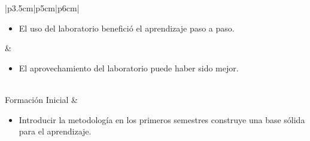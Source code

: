 \documentclass[12pt]{article}
\begin{document}
\begin{longtable}{|p{3.5cm}|p{5cm}|p{6cm}|}
\begin{minipage}[H]{1.0\linewidth}
\begin{itemize}[leftmargin=8pt]
                                 \item El uso del laboratorio benefició el aprendizaje paso a paso.
                                 \end{itemize}
                                 \vspace{0.5pt}
                               \end{minipage} & \begin{minipage}[H]{1.0\linewidth}
                                 \begin{itemize}[leftmargin=8pt]
                                 \item El aprovechamiento del laboratorio puede haber sido mejor.
                                 \end{itemize}
                               \end{minipage} \\ \hline 
    Formación Inicial & \begin{minipage}[H]{1.0\linewidth}
      \vspace{2pt}
                                 \begin{itemize}[leftmargin=8pt]
                                 \item Introducir la metodología en los primeros semestres construye una base sólida para el aprendizaje.


\end{itemize}
\end{minipage}
\end{longtable}
\end{document}
